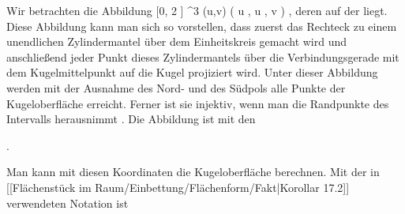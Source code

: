 {

Wir betrachten die Abbildung
\maabbeledisp {\varphi} { [0, 2 \pi] \times \R} {\R^3
} {(u,v)} { {  }  ( \cos  u  , \sin  u  , v )
} {,}
deren
auf der  {} liegt. Diese Abbildung kann man sich so vorstellen, dass zuerst das
 {} {}
Rechteck
\mathl{[0, 2 \pi] \times \R}{} zu einem unendlichen Zylindermantel über dem Einheitskreis gemacht wird und anschließend jeder Punkt dieses Zylindermantels über die Verbindungsgerade mit dem Kugelmittelpunkt auf die Kugel projiziert wird. Unter dieser Abbildung werden mit der Ausnahme des Nord- und des Südpols alle Punkte der Kugeloberfläche erreicht. Ferner ist sie injektiv, wenn man die Randpunkte des Intervalls herausnimmt
 {} {.}
Die Abbildung ist
mit den

 { . }

Man kann mit diesen Koordinaten die Kugeloberfläche berechnen. Mit der in
[[Flächenstück im Raum/Einbettung/Flächenform/Fakt|Korollar 17.2]]
verwendeten Notation ist

}
